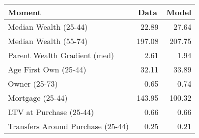 \begin{tabular}{lrr}
\toprule
\multicolumn{1}{l}{Moment} & \multicolumn{1}{c}{Data} & \multicolumn{1}{c}{Model}\\
\midrule
Median Wealth (25-44) & 22.89 & 27.64\\
Median Wealth (55-74) & 197.08 & 207.75\\
Parent Wealth Gradient (med) & 2.61 & 1.94\\
Age First Own (25-44) & 32.11 & 33.89\\
Owner (25-73) & 0.65 & 0.74\\
Mortgage (25-44) & 143.95 & 100.32\\
LTV at Purchase (25-44) & 0.66 & 0.66\\
Transfers Around Purchase (25-44) & 0.25 & 0.21\\
\bottomrule
\end{tabular}
